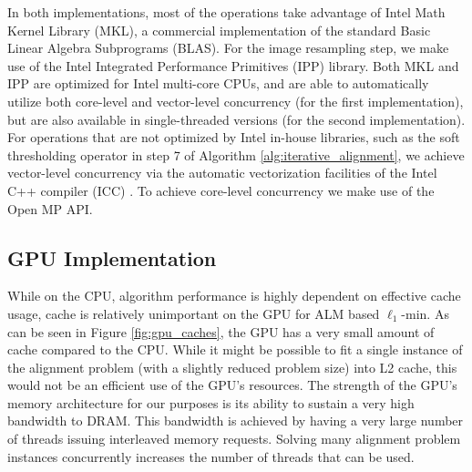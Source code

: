 \documentclass[preprint]{sigplanconf}
\begin{document}
In both implementations, most of the operations take
advantage of Intel Math Kernel Library (MKL), a commercial implementation of
the standard Basic Linear Algebra Subprograms (BLAS). For the image resampling
step, we make use of the Intel Integrated Performance Primitives (IPP) library.
Both MKL and IPP are optimized for Intel multi-core CPUs, and are able to
automatically utilize both core-level and vector-level concurrency (for the first implementation),
but are also available in single-threaded versions (for the second implementation). For 
operations that are not optimized by Intel in-house libraries, such as the soft thresholding
operator in step 7 of Algorithm \ref{alg:iterative_alignment}, we achieve 
vector-level concurrency via
the automatic vectorization facilities of the Intel C++ compiler (ICC) \cite{dulong1999overview}.
To achieve core-level concurrency we make use of the Open MP API. \cite{dagum2002openmp} 

\subsection{GPU Implementation} \vspace{-0.06in}
\label{sec:alignment_implementation_gpu}
While on the CPU, algorithm performance is highly dependent on effective
cache usage, cache is relatively unimportant on the GPU for ALM based
$\ell_1$-min.  As can be seen in Figure \ref{fig:gpu_caches}, the GPU has 
a very small amount of cache compared to the CPU.  While it might be possible
to fit a single instance of the alignment problem (with a slightly reduced problem size)
into L2 cache, this would not be an efficient use of the GPU's resources.
The strength of the GPU's memory architecture for our purposes is its ability to sustain a very
high bandwidth to DRAM.  This bandwidth is achieved by having a very large number of
threads issuing interleaved memory requests.  Solving many alignment problem instances
concurrently increases the number of threads that can be used.
\end{document}
